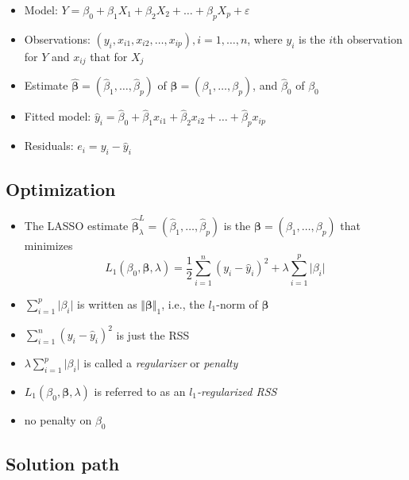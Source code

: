 \documentclass[]{article}
\providecommand{\tightlist}{%
  \setlength{\itemsep}{0pt}\setlength{\parskip}{0pt}}
\begin{document}
\begin{itemize}
\item
  Model:
  \(Y=\beta_0+\beta_1 X_1 + \beta_2 X_2 + \ldots + \beta_p X_p + \varepsilon\)
\item
  Observations: \((y_i,x_{i1},x_{i2},\ldots,x_{ip}),i=1,\ldots,n\),
  where \(y_i\) is the \(i\)th observation for \(Y\) and \(x_{ij}\) that
  for \(X_j\)
\item
  Estimate
  \(\hat{\boldsymbol{\beta}}=(\hat{\beta}_1,\ldots,\hat{\beta}_p)\) of
  \({\boldsymbol{\beta}}=({\beta}_1,\ldots,{\beta}_p)\), and
  \(\hat{\beta}_0\) of \({\beta}_0\)
\item
  Fitted model:
  \(\hat{y}_i=\hat{\beta}_0+\hat{\beta}_1 x_{i1} + \hat{\beta}_2 x_{i2} + \ldots + \hat{\beta}_p x_{ip}\)
\item
  Residuals: \(e_i=y_i - \hat{y}_i\)
\end{itemize}

\subsection{Optimization}\label{optimization-1}

\begin{itemize}
\tightlist
\item
  The LASSO estimate
  \(\hat{\boldsymbol{\beta}}^L_{\lambda}=(\hat{\beta}_1,\ldots,\hat{\beta}_p)\)
  is the \({\boldsymbol{\beta}}=({\beta}_1,\ldots,{\beta}_p)\) that
  minimizes \[
  L_1(\beta_0,\boldsymbol{\beta},\lambda)= \frac{1}{2}\sum_{i=1}^n (y_i - \hat{y}_i)^2 + \lambda \sum_{i=1}^p\vert \beta_i \vert
  \]
\item
  \(\sum_{i=1}^p \vert\beta_i\vert\) is written as
  \(\Vert\boldsymbol{\beta}\Vert_1\), i.e., the \(l_1\)-norm of
  \(\boldsymbol{\beta}\)\\
\item
  \(\sum_{i=1}^n (y_i - \hat{y}_i)^2\) is just the RSS
\item
  \(\lambda \sum_{i=1}^p \vert\beta_i\vert\) is called a
  \emph{regularizer} or \emph{penalty}
\item
  \(L_1(\beta_0,\boldsymbol{\beta},\lambda)\) is referred to as an
  \emph{\(l_1\)-regularized RSS}
\item
  no penalty on \(\beta_0\)
\end{itemize}

\subsection{Solution path}\label{solution-path-1}
\end{document}
